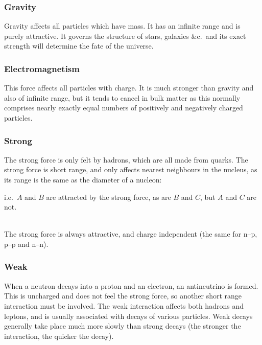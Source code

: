 \documentclass[a4paper,12pt]{article}
\begin{document}
\subsubsection{Gravity}
Gravity affects all particles which have mass.  It has an infinite range and is purely attractive.  It governs the structure of stars, galaxies \&{}c.\ and its exact strength will determine the fate of the universe.

\subsubsection{Electromagnetism}
This force affects all particles with charge.  It is much stronger than gravity and also of infinite range, but it tends to cancel in bulk matter as this normally comprises nearly exactly equal numbers of positively and negatively charged particles.

\subsubsection{Strong}

The strong force is only felt by hadrons, which are all made from quarks.  The strong force is short range, and only affects nearest neighbours in the nucleus, as its range is the same as the diameter of a nucleon:\\

\noindent \begin{minipage}[c]{0.5\textwidth}
\end{minipage}\begin{minipage}[c]{0.5\textwidth}
i.e.\ $A$ and $B$ are attracted by the strong force, as are $B$ and $C$, but $A$ and $C$ are not.
\end{minipage}\\

The strong force is always attractive, and charge independent (the same for n--p, p--p and n--n).

\subsubsection{Weak}

When a neutron decays into a proton and an electron, an antineutrino is formed.  This is uncharged and does not feel the strong force, so another short range interaction must be involved.  The weak interaction affects both hadrons and leptons, and is usually associated with decays of various particles.  Weak decays generally take place much more slowly than strong decays (the stronger the interaction, the quicker the decay).
\end{document}
